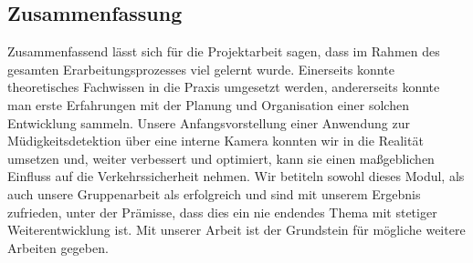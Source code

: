\subsection{Zusammenfassung}
Zusammenfassend lässt sich für die Projektarbeit sagen, dass im Rahmen des gesamten Erarbeitungsprozesses viel gelernt wurde. Einerseits konnte theoretisches Fachwissen in die Praxis umgesetzt werden, andererseits konnte man erste Erfahrungen mit der Planung und Organisation einer solchen Entwicklung sammeln. Unsere Anfangsvorstellung einer Anwendung zur Müdigkeitsdetektion über eine interne Kamera konnten wir in die Realität umsetzen und, weiter verbessert und optimiert, kann sie einen maßgeblichen Einfluss auf die Verkehrssicherheit nehmen. Wir betiteln sowohl dieses Modul, als auch unsere Gruppenarbeit als erfolgreich und sind mit unserem Ergebnis zufrieden, unter der Prämisse, dass dies ein nie endendes Thema mit stetiger Weiterentwicklung ist. Mit unserer Arbeit ist der Grundstein für mögliche weitere Arbeiten gegeben.